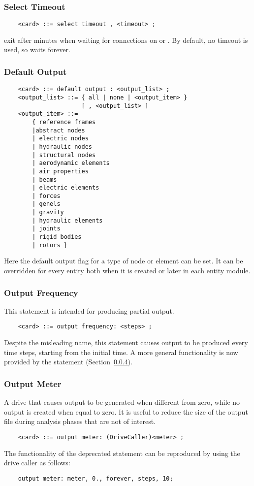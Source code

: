 \subsubsection{Select Timeout}
\begin{verbatim}
    <card> ::= select timeout , <timeout> ;
\end{verbatim}
exit after  minutes when waiting for connections 
on  or .
By default, no timeout is used, so  waits forever.

\subsubsection{Default Output}\label{sec:CONTROLDATA:DEFAULTOUTPUT}
\begin{verbatim}
    <card> ::= default output : <output_list> ;
    <output_list> ::= { all | none | <output_item> } 
                      [ , <output_list> ]
    <output_item> ::=
        { reference frames
        |abstract nodes
        | electric nodes
        | hydraulic nodes
        | structural nodes
        | aerodynamic elements
        | air properties
        | beams
        | electric elements
        | forces
        | genels
        | gravity
        | hydraulic elements
        | joints
        | rigid bodies
        | rotors }
\end{verbatim}
Here the default output flag for a type of node or element can be set. It
can be overridden for every entity both when it is created or later in
each entity module.

\subsubsection{Output Frequency}
\label{sec:CONTROLDATA:OUTPUTFREQUENCY}
This statement is intended for producing partial output.
\begin{verbatim}
    <card> ::= output frequency: <steps> ;
\end{verbatim}
Despite the misleading name, this statement causes output to be produced
every  time steps, starting from the initial time.
A more general functionality is now provided by the 
statement (Section~\ref{sec:CONTROLDATA:OUTPUTMETER}).

\subsubsection{Output Meter}
\label{sec:CONTROLDATA:OUTPUTMETER}
A drive that causes output to be generated when different from zero,
while no output is created when equal to zero.  It is useful to reduce 
the size of the output file during analysis phases that are not of interest.
\begin{verbatim}
    <card> ::= output meter: (DriveCaller)<meter> ;
\end{verbatim}
The functionality of the deprecated  statement
can be reproduced by using the  drive caller as follows:
\begin{verbatim}
    output meter: meter, 0., forever, steps, 10;
\end{verbatim}

